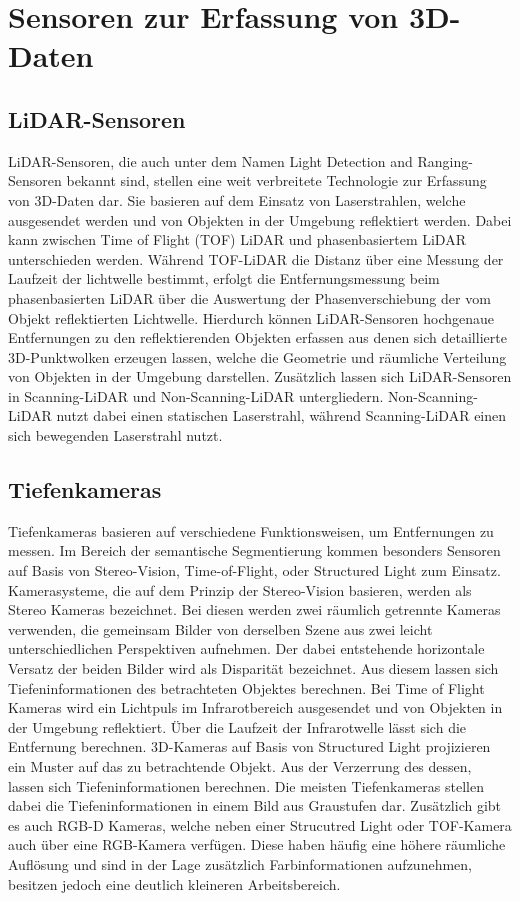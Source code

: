 \chapter{Sensoren zur Erfassung von 3D-Daten}

\section{LiDAR-Sensoren}
LiDAR-Sensoren, die auch unter dem Namen Light Detection and Ranging-Sensoren
bekannt sind, stellen eine weit verbreitete Technologie zur Erfassung von
3D-Daten dar. Sie basieren auf dem Einsatz von Laserstrahlen, welche
ausgesendet werden und von Objekten in der Umgebung reflektiert werden. Dabei
kann zwischen Time of Flight (TOF) LiDAR und phasenbasiertem LiDAR
unterschieden werden. Während TOF-LiDAR die Distanz über eine Messung der
Laufzeit der lichtwelle bestimmt, erfolgt die Entfernungsmessung beim
phasenbasierten LiDAR über die Auswertung der Phasenverschiebung der vom Objekt
reflektierten Lichtwelle. Hierdurch können LiDAR-Sensoren hochgenaue
Entfernungen zu den reflektierenden Objekten erfassen aus denen sich
detaillierte 3D-Punktwolken erzeugen lassen, welche die Geometrie und räumliche
Verteilung von Objekten in der Umgebung darstellen. Zusätzlich lassen sich
LiDAR-Sensoren in Scanning-LiDAR und Non-Scanning-LiDAR untergliedern.
Non-Scanning-LiDAR nutzt dabei einen statischen Laserstrahl, während
Scanning-LiDAR einen sich bewegenden Laserstrahl nutzt. \cite{8529992}

\section{Tiefenkameras}
Tiefenkameras basieren auf verschiedene Funktionsweisen, um Entfernungen zu
messen. Im Bereich der semantische Segmentierung kommen besonders Sensoren auf
Basis von Stereo-Vision, Time-of-Flight, oder Structured Light zum Einsatz.
Kamerasysteme, die auf dem Prinzip der Stereo-Vision basieren, werden als
Stereo Kameras bezeichnet. Bei diesen werden zwei räumlich getrennte Kameras
verwenden, die gemeinsam Bilder von derselben Szene aus zwei leicht
unterschiedlichen Perspektiven aufnehmen. Der dabei entstehende horizontale
Versatz der beiden Bilder wird als Disparität bezeichnet. Aus diesem lassen
sich Tiefeninformationen des betrachteten Objektes berechnen. Bei Time of
Flight Kameras wird ein Lichtpuls im Infrarotbereich ausgesendet und von
Objekten in der Umgebung reflektiert. Über die Laufzeit der Infrarotwelle lässt
sich die Entfernung berechnen. 3D-Kameras auf Basis von Structured Light
projizieren ein Muster auf das zu betrachtende Objekt. Aus der Verzerrung des
dessen, lassen sich Tiefeninformationen berechnen. Die meisten Tiefenkameras
stellen dabei die Tiefeninformationen in einem Bild aus Graustufen dar.
Zusätzlich gibt es auch RGB-D Kameras, welche neben einer Strucutred Light oder
TOF-Kamera auch über eine RGB-Kamera verfügen. Diese haben häufig eine höhere
räumliche Auflösung und sind in der Lage zusätzlich Farbinformationen
aufzunehmen, besitzen jedoch eine deutlich kleineren Arbeitsbereich.

